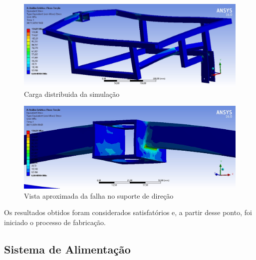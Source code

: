 \begin{figure}[!htbp]
	\centering
	\includegraphics[width=.7\textwidth]{figuras/carga_distribuida2.eps}
	\caption{Carga distribuida da simulação}
\end{figure}

\begin{figure}[!htbp]
	\centering
	\includegraphics[width=.7\textwidth]{figuras/zoom_suporte.eps}
	\caption{Vista aproximada da falha no suporte de direção}
\end{figure}

Os resultados obtidos foram considerados satisfatórios e, a partir desse ponto, foi iniciado o processo de fabricação.

  \subsection{Sistema de Alimentação}

